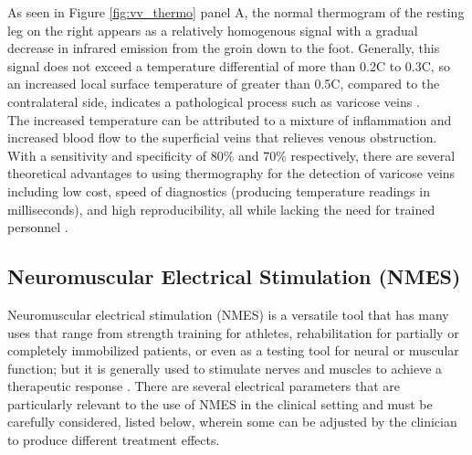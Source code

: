 \documentclass[11.5pt]{article}
\begin{document}
As seen in Figure \ref{fig:vv_thermo} panel A, the normal thermogram of the resting leg on the right appears as a relatively homogenous signal with a gradual decrease in infrared emission from the groin down to the foot. Generally, this signal does not exceed a temperature differential of more than 0.2\textdegree C to 0.3\textdegree C, so an increased local surface temperature of greater than 0.5\textdegree C, compared to the contralateral side, indicates a pathological process such as varicose veins \cite{Shaydakov}.\\

The increased temperature can be attributed to a mixture of inflammation and increased blood flow to the superficial veins that relieves venous obstruction. With a sensitivity and specificity of 80\% and 70\% respectively, there are several theoretical advantages to using thermography for the detection of varicose veins including low cost, speed of diagnostics (producing temperature readings in milliseconds), and high reproducibility, all while lacking the need for trained personnel \cite{Shaydakov, Usamentiaga}. 

\subsection{Neuromuscular Electrical Stimulation (NMES)}
Neuromuscular electrical stimulation (NMES) is a versatile tool that has many uses that range from strength training for athletes, rehabilitation for partially or completely immobilized patients, or even as a testing tool for neural or muscular function; but it is generally used to stimulate nerves and muscles to achieve a therapeutic response \cite{Herbert}. There are several electrical parameters that are particularly relevant to the use of NMES in the clinical setting and must be carefully considered, listed below, wherein some can be adjusted by the clinician to produce different treatment effects.
\end{document}
